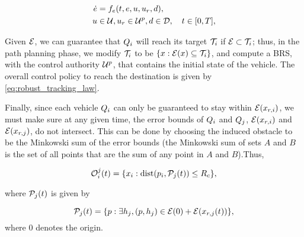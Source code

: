 \begin{equation}
\label{eq:edyn} %
\begin{aligned}
\dot{e} &= f_e(t, e, u, u_r,d), \\
u &\in \cset, u_r\in\cset^p, d \in \dset, \quad t \in [0, T],
\end{aligned}
\end{equation}

Given $\mathcal{E}$, we can guarantee that $Q_i$ will reach its target $\mathcal{T}_i$ if $\mathcal{E} \subset \mathcal{T}_i$; thus, in the path planning phase, we modify $\mathcal{T}_i$ to be $\{x: \mathcal{E}(x) \subseteq \mathcal{T}_i\}$, and compute a BRS, with the control authority $\mathcal{U}^p$, that contains the initial state of the vehicle. The overall control policy to reach the destination is given by \ref{eq:robust_tracking_law}.

Finally, since each vehicle $Q_i$ can only be guaranteed to stay within $\mathcal{E}(x_{r,i})$, we must make sure at any given time, the error bounds of $Q_i$ and $Q_j$, $\mathcal{E}(x_{r,i})$ and $\mathcal{E}(x_{r,j})$, do not intersect. This can be done by choosing the induced obstacle to be the Minkowski sum of the error bounds (the Minkowski sum of sets $A$ and $B$ is the set of all points that are the sum of any point in $A$ and $B$).Thus,

\begin{equation}
\mathcal{O}_i^j(t) = \{x_i: \text{dist}(p_i, \mathcal{P}_j(t)) \le R_c \},
\end{equation}

\noindent where $\mathcal{P}_j(t)$ is given by

\begin{equation}
\mathcal{P}_j(t) = \{p: \exists h_j, (p, h_j) \in \mathcal{E}(0) + \mathcal{E}(x_{r,j}(t)) \},
\end{equation}
\noindent where $0$ denotes the origin. 

